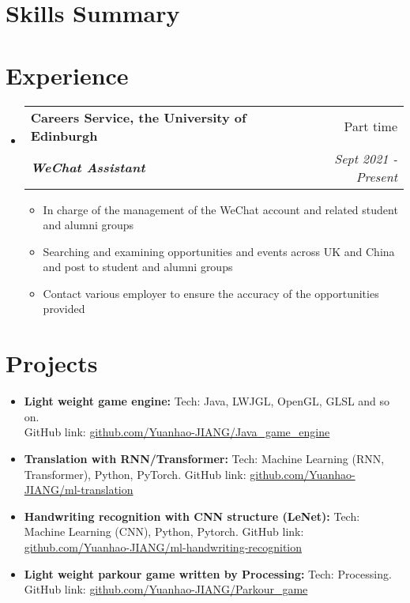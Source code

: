 \documentclass[12pt, a4paper]{article}
\makeatletter
\newcommand{\resumeSection}[1]{
    \section*{#1}
}
\newcommand{\resumeSectionItm}[4]{
\item
    \begin{tabular*}{0.96\textwidth}{@{}l@{\extracolsep{\fill}}r@{}}
        \textbf{#1} & #2 \\
        \textit{\textbf{#3}} & \textit{#4}
    \end{tabular*}
}
\newcommand{\resumeSectionSubItm}[2]{
\item 
    \textbf{\parbox[t]{4.6cm}{#1\hfill}}\parbox[t]{12.5cm}{#2}\vspace{-2mm}
}
\newcommand{\resumeSectionSubItmI}[1]{
\item {#1}\vspace{-2mm}
}
\newcommand{\resumeSectionSubItmII}[2]{
\item \textbf{#1: }{#2}\vspace{-2mm}
}
\makeatother
\begin{document}
\resumeSection{Skills Summary}
\vspace{-2.5mm}

\resumeSection{Experience}
\begin{itemize}[leftmargin=*]
    \resumeSectionItm
    {Careers Service, the University of Edinburgh}{Part time}
    {WeChat Assistant}{Sept 2021 - Present}
    \vspace{-2mm}
    \begin{itemize}[leftmargin=*]
        \resumeSectionSubItmI{In charge of the management of the WeChat 
            account and related student and alumni groups}
        \resumeSectionSubItmI{Searching and examining opportunities and events 
            across UK and China and post to student and alumni groups}
        \resumeSectionSubItmI{Contact various employer to ensure the accuracy 
            of the opportunities provided}
    \end{itemize}
\end{itemize}
\vspace{-3mm}

\resumeSection{Projects}
\vspace{1mm}
\begin{itemize}[leftmargin=*]
    \resumeSectionSubItmII{Light weight game engine}{Tech: Java, LWJGL, 
        OpenGL, GLSL and so on.\\ GitHub link: 
        \href{https://github.com/Yuanhao-JIANG/Java\_game\_engine}
        {github.com/Yuanhao-JIANG/Java\_game\_engine}}
    \resumeSectionSubItmII{Translation with RNN/Transformer}{Tech: Machine 
        Learning (RNN, Transformer), Python, PyTorch. GitHub link: 
        \href{https://github.com/Yuanhao-JIANG/ml-translation}
        {github.com/Yuanhao-JIANG/ml-translation}}
    \resumeSectionSubItmII{Handwriting recognition with CNN structure (LeNet)}
        {Tech: Machine Learning (CNN), Python, Pytorch. GitHub link: 
        \href{https://github.com/Yuanhao-JIANG/ml-handwriting-recognition}
        {github.com/Yuanhao-JIANG/ml-handwriting-recognition}}
    \resumeSectionSubItmII{Light weight parkour game written by Processing}
        {Tech: Processing.\\ GitHub link: 
        \href{https://github.com/Yuanhao-JIANG/Parkour_game}
        {github.com/Yuanhao-JIANG/Parkour\_game}}
\end{itemize}
\end{document}
